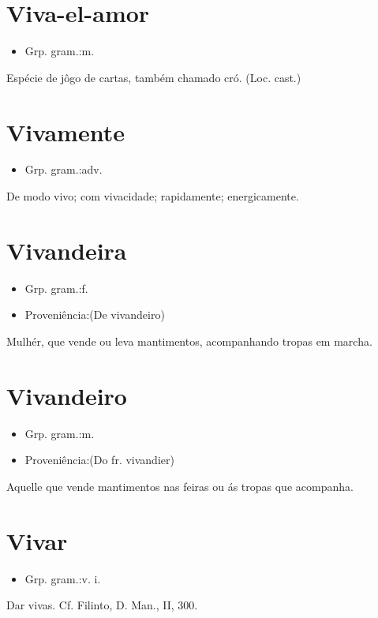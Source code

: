 \documentclass{article}
\begin{document}
\section{Viva-el-amor}
\begin{itemize}
\item {Grp. gram.:m.}
\end{itemize}
Espécie de jôgo de cartas, também chamado \textunderscore cró\textunderscore .
(Loc. cast.)
\section{Vivamente}
\begin{itemize}
\item {Grp. gram.:adv.}
\end{itemize}
De modo vivo; com vivacidade; rapidamente; energicamente.
\section{Vivandeira}
\begin{itemize}
\item {Grp. gram.:f.}
\end{itemize}
\begin{itemize}
\item {Proveniência:(De \textunderscore vivandeiro\textunderscore )}
\end{itemize}
Mulhér, que vende ou leva mantimentos, acompanhando tropas em marcha.
\section{Vivandeiro}
\begin{itemize}
\item {Grp. gram.:m.}
\end{itemize}
\begin{itemize}
\item {Proveniência:(Do fr. \textunderscore vivandier\textunderscore )}
\end{itemize}
Aquelle que vende mantimentos nas feiras ou ás tropas que acompanha.
\section{Vivar}
\begin{itemize}
\item {Grp. gram.:v. i.}
\end{itemize}
Dar vivas. Cf. Filinto, \textunderscore D. Man.\textunderscore , II, 300.
\end{document}

